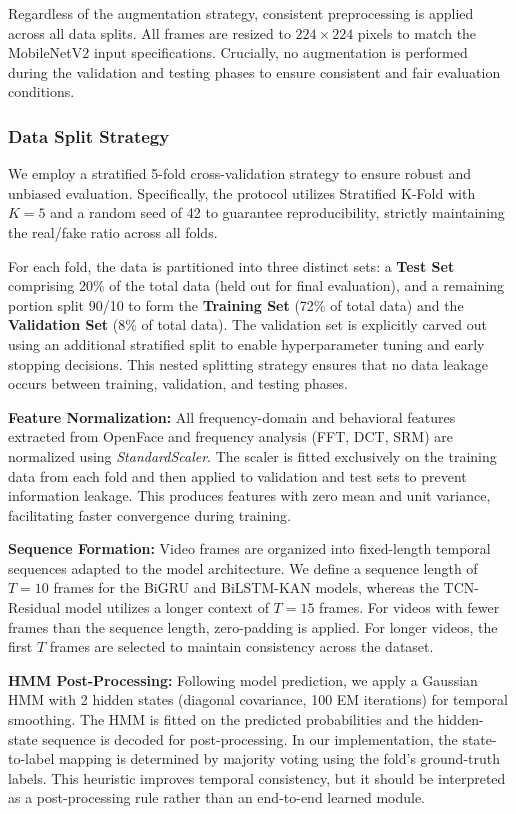 \documentclass[conference]{IEEEtran}
\begin{document}
Regardless of the augmentation strategy, consistent preprocessing is applied across all data splits. All frames are resized to $224 \times 224$ pixels to match the MobileNetV2 input specifications. Crucially, no augmentation is performed during the validation and testing phases to ensure consistent and fair evaluation conditions.

\subsubsection{Data Split Strategy}
\mbox{}

We employ a stratified 5-fold cross-validation strategy to ensure robust and unbiased evaluation. Specifically, the protocol utilizes Stratified K-Fold with $K=5$ and a random seed of 42 to guarantee reproducibility, strictly maintaining the real/fake ratio across all folds.

For each fold, the data is partitioned into three distinct sets: a \textbf{Test Set} comprising 20\% of the total data (held out for final evaluation), and a remaining portion split 90/10 to form the \textbf{Training Set} (72\% of total data) and the \textbf{Validation Set} (8\% of total data). The validation set is explicitly carved out using an additional stratified split to enable hyperparameter tuning and early stopping decisions. This nested splitting strategy ensures that no data leakage occurs between training, validation, and testing phases.

\textbf{Feature Normalization:} All frequency-domain and behavioral features extracted from OpenFace and frequency analysis (FFT, DCT, SRM) are normalized using \textit{StandardScaler}. The scaler is fitted exclusively on the training data from each fold and then applied to validation and test sets to prevent information leakage. This produces features with zero mean and unit variance, facilitating faster convergence during training.

\textbf{Sequence Formation:} Video frames are organized into fixed-length temporal sequences adapted to the model architecture. We define a sequence length of $T=10$ frames for the BiGRU and BiLSTM-KAN models, whereas the TCN-Residual model utilizes a longer context of $T=15$ frames. For videos with fewer frames than the sequence length, zero-padding is applied. For longer videos, the first $T$ frames are selected to maintain consistency across the dataset.

\textbf{HMM Post-Processing:} Following model prediction, we apply a Gaussian HMM with 2 hidden states (diagonal covariance, 100 EM iterations) for temporal smoothing. The HMM is fitted on the predicted probabilities and the hidden-state sequence is decoded for post-processing. In our implementation, the state-to-label mapping is determined by majority voting using the fold's ground-truth labels. This heuristic improves temporal consistency, but it should be interpreted as a post-processing rule rather than an end-to-end learned module.
\end{document}
